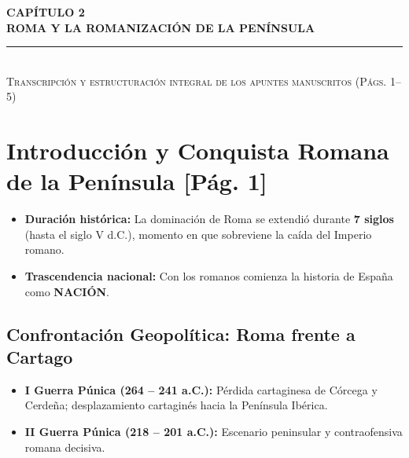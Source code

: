 \documentclass[11pt,letterpaper]{article}
\begin{document}
\begin{headerbox}
  \begin{center}
    {\Huge\bfseries\color{romaRed!90!black} CAPÍTULO 2}\\[4pt]
    {\LARGE\bfseries\color{romaDark} ROMA Y LA ROMANIZACIÓN DE LA PENÍNSULA}\\[6pt]
    \rule{0.65\linewidth}{0.6pt}\\[6pt]
    {\small\color{black!70}\textsc{Transcripción y estructuración integral de los apuntes manuscritos (Págs. 1--5)}}
  \end{center}
\end{headerbox}

\vspace{6pt}

\section{Introducción y Conquista Romana de la Península \hfill\normalfont\small\color{gray}[Pág. 1]}

\begin{conceptbox}[title={Marco General: La dominación de Roma}]
  \begin{itemize}
    \item \textbf{Duración histórica:} La dominación de Roma se extendió durante \textbf{7 siglos} (hasta el siglo V d.C.), momento en que sobreviene la caída del Imperio romano.
    \item \textbf{Trascendencia nacional:} Con los romanos comienza la historia de España como \textbf{NACIÓN}.
  \end{itemize}
\end{conceptbox}

\subsection{Confrontación Geopolítica: Roma frente a Cartago}

\begin{notabox}[title={Cronología de las Guerras Púnicas (264 -- 146 a.C. / siglos III--II a.C.)}]
  \begin{itemize}[leftmargin=1.2em]
    \item \textbf{I Guerra Púnica (264 -- 241 a.C.):} Pérdida cartaginesa de Córcega y Cerdeña; desplazamiento cartaginés hacia la Península Ibérica.
    \item \textbf{II Guerra Púnica (218 -- 201 a.C.):} Escenario peninsular y contraofensiva romana decisiva.
  \end{itemize}
\end{notabox}
\end{document}
